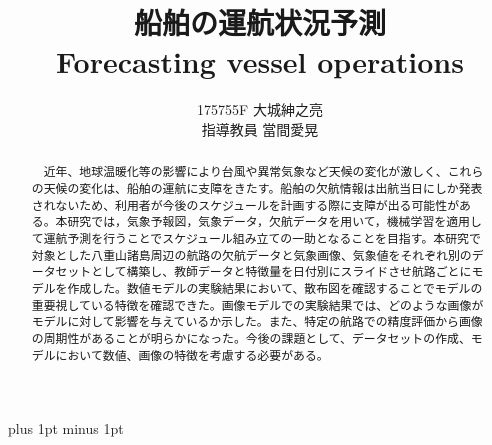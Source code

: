 \documentclass[a4j,12pt]{jreport}
\title{
船舶の運航状況予測\\
Forecasting vessel operations
}
\author{175755F 大城紳之亮  \\ 指導教員 {當間愛晃} }
\begin{document}
\maketitle
\baselineskip 17pt plus 1pt minus 1pt

\setcounter{page}{0}
\begin{abstract}
　近年、地球温暖化等の影響により台風や異常気象など天候の変化が激しく、これらの天候の変化は、船舶の運航に支障をきたす。船舶の欠航情報は出航当日にしか発表されないため、利用者が今後のスケジュールを計画する際に支障が出る可能性がある。本研究では，気象予報図，気象データ，欠航データを用いて，機械学習を適用して運航予測を行うことでスケジュール組み立ての一助となることを目指す。本研究で対象とした八重山諸島周辺の航路の欠航データと気象画像、気象値をそれぞれ別のデータセットとして構築し、教師データと特徴量を日付別にスライドさせ航路ごとにモデルを作成した。数値モデルの実験結果において、散布図を確認することでモデルの重要視している特徴を確認できた。画像モデルでの実験結果では、どのような画像がモデルに対して影響を与えているか示した。また、特定の航路での精度評価から画像の周期性があることが明らかになった。今後の課題として、データセットの作成、モデルにおいて数値、画像の特徴を考慮する必要がある。
\end{abstract} 

\tableofcontents	%
\listoffigures		%
\listoftables		%

\renewcommand{\abstractname}{abstract}


















%
\end{document}
